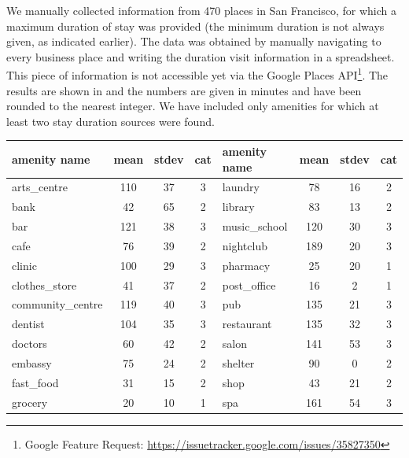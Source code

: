 We manually collected information from 470 places in San Francisco, for which a maximum duration of stay was provided (the minimum duration is not always given, as indicated earlier).
The data was obtained by manually navigating to every business place and writing the duration visit information in a spreadsheet.
This piece of information is not accessible yet via the Google Places API\footnote{Google Feature Request: \url{https://issuetracker.google.com/issues/35827350}}.
The results are shown in  and the numbers are given in minutes and have been rounded to the nearest integer. We have included only amenities for which at least two stay duration sources were found. 

\begin{table}[!ht]
	{\begin{tabular}{ | l | c | c | c || l | c | c | c |}
		\hline		
		\textbf{amenity name} & \textbf{mean} & \textbf{stdev} & \textbf{cat} & \textbf{amenity name} & \textbf{mean} & \textbf{stdev} & \textbf{cat} \\ \hline
		arts\_centre  & 110 & 37 & 3 & laundry  & 78 & 16 & 2 \\ \hline
		bank  & 42 & 65 & 2 &  library  & 83 & 13 & 2 \\ \hline
		bar  & 121 & 38 & 3 &  music\_school  & 120 & 30 & 3 \\ \hline
		cafe  & 76 & 39 & 2 &  nightclub  & 189 & 20 & 3 \\ \hline
		clinic  & 100 & 29 & 3 &  pharmacy  & 25 & 20 & 1 \\ \hline
		clothes\_store  & 41 & 37 & 2 &  post\_office  & 16 & 2 & 1 \\ \hline
		community\_centre  & 119 & 40 & 3 &  pub  & 135 & 21 & 3 \\ \hline
		dentist  & 104 & 35 & 3 &  restaurant  & 135 & 32 & 3 \\ \hline
		doctors  & 60 & 42 & 2 &  salon  & 141 & 53 & 3 \\ \hline
		embassy  & 75 & 24 & 2 &  shelter  & 90 & 0 & 2 \\ \hline
		fast\_food  & 31 & 15 & 2 &  shop  & 43 & 21 & 2 \\ \hline
		grocery  & 20 & 10 & 1 &  spa  & 161 & 54 & 3 \\ \hline

\end{tabular}}
\end{table}
